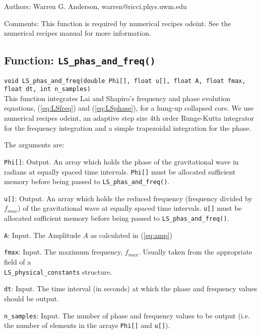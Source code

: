 \begin{description}
\item{Authors:} Warren G. Anderson, warren@ricci.phys.uwm.edu 
\item{Comments:} This function is required by numerical recipes odeint. See
the numerical recipes manual for more information.
\end{description}
\newpage

\subsection{Function: {\tt LS\_phas\_and\_freq()}}
{\tt void LS\_phas\_and\_freq(double Phi[], float u[], float A, 
           float fmax, float dt, int n\_samples)}\\
This function integrates Lai and Shapiro's frequency and phase evolution 
equations, (\ref{eq:LSfreq}) and (\ref{eq:LSphase}), for a hung-up 
collapsed core. We use numerical recipes odeint, an adaptive step size 
4th order Runge-Kutta integrator for the frequency integration and a
simple trapezoidal integration for the phase.

The arguments are:
\begin{description}
\item{\tt Phi[]}: Output. An array which holds the phase of the gravitational
wave in radians at equally spaced time intervals. {\tt Phi[]} must be allocated
sufficient memory before being passed to {\tt LS\_phas\_and\_freq()}.
\item{\tt u[]}: Output. An array which holds the reduced frequency (frequency
divided by $f_{max}$) of the gravitational wave at equally spaced time
intervals. {\tt u[]} must be allocated sufficient memory before being passed
to {\tt LS\_phas\_and\_freq()}.
\item{\tt A}: Input. The Amplitude $A$ as calculated in (\ref{eq:amp})
\item{\tt fmax}: Input. The maximum frequency, $f_{max}$. Usually taken from
the appropriate field of a\\ {\tt LS\_physical\_constants} structure.
\item{\tt dt}: Input. The time interval (in seconds) at which the phase and 
frequency values should be output.
\item{\tt n\_samples}: Input. The number of phase and frequency values to be
output (i.e. the number of elements in the arrays {\tt Phi[]} and {\tt u[]}).
\end{description}

